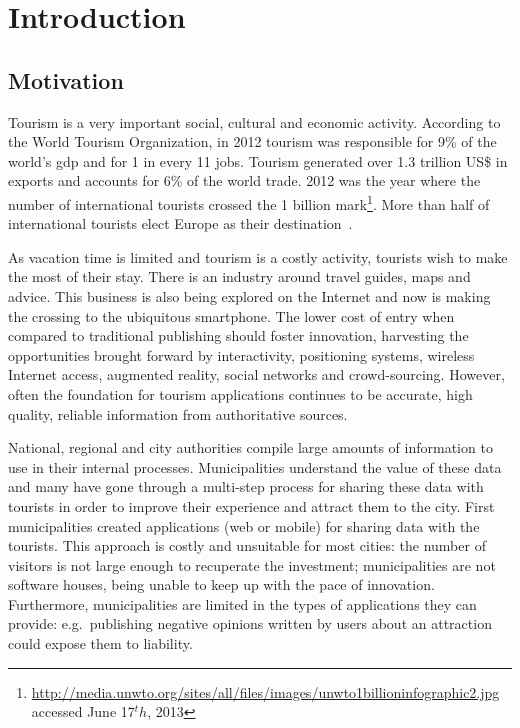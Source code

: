 \documentclass[times,doublespace]{ettauth}%
\begin{document}
\maketitle

\acresetall
\section{Introduction}

\subsection{Motivation}
\label{s:motivation}
Tourism is a very important social, cultural and economic activity.
According to the World Tourism Organization, in 2012 tourism was responsible for 9\% of the world's \ac{gdp} and for 1 in every 11 jobs.
Tourism generated over 1.3 trillion US\$ in exports and accounts for 6\% of the world trade.
2012 was the year where the number of international tourists crossed the 1 billion mark\footnote{\url{http://media.unwto.org/sites/all/files/images/unwto1billioninfographic2.jpg} accessed June 17$^th$, 2013}.
More than half of international tourists elect Europe as their destination~\cite{unwto}.

As vacation time is limited and tourism is a costly activity, tourists wish to make the most of their stay.
There is an industry around travel guides, maps and advice.
This business is also being explored on the Internet and now is making the crossing to the ubiquitous smartphone.
The lower cost of entry when compared to traditional publishing should foster innovation, harvesting the opportunities brought forward by interactivity, positioning systems, wireless Internet access, augmented reality, social networks and crowd-sourcing. 
However, often the foundation for tourism applications continues to be accurate, high quality, reliable information from authoritative sources.

National, regional and city authorities compile large amounts of information to use in their internal processes.
Municipalities understand the value of these data and many have gone through a multi-step process for sharing these data with tourists in order to improve their experience and attract them to the city.
First municipalities created applications (web or mobile) for sharing data with the tourists.
This approach is costly and unsuitable for most cities: the number of visitors is not large enough to recuperate the investment; municipalities are not software houses, being unable to keep up with the pace of innovation. 
Furthermore, municipalities are limited in the types of applications they can provide: e.g.\ publishing negative opinions written by users about an attraction could expose them to liability.
\end{document}

